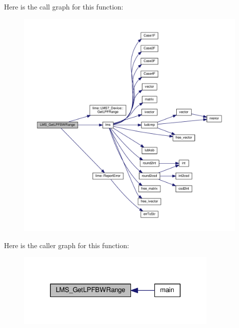 Here is the call graph for this function\+:
\nopagebreak
\begin{figure}[H]
\begin{center}
\leavevmode
\includegraphics[width=350pt]{df/de1/lms7__api_8cpp_aa1ef3ea17a29cb1b087d4bcfbf481169_cgraph}
\end{center}
\end{figure}




Here is the caller graph for this function\+:
\nopagebreak
\begin{figure}[H]
\begin{center}
\leavevmode
\includegraphics[width=275pt]{df/de1/lms7__api_8cpp_aa1ef3ea17a29cb1b087d4bcfbf481169_icgraph}
\end{center}
\end{figure}



